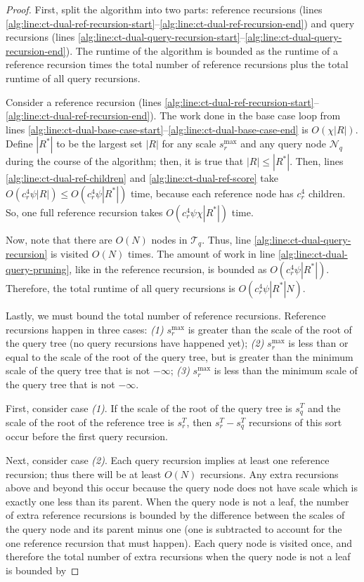 \vspace*{-1.23em}
\begin{proof}
First, split the algorithm into two parts: reference recursions (lines
\ref{alg:line:ct-dual-ref-recursion-start}--\ref{alg:line:ct-dual-ref-recursion-end})
and query recursions (lines
\ref{alg:line:ct-dual-query-recursion-start}--\ref{alg:line:ct-dual-query-recursion-end}).
The runtime of the algorithm is bounded as the runtime of a reference recursion
times the total number of reference recursions plus the total runtime of all
query recursions.

Consider a reference recursion (lines
\ref{alg:line:ct-dual-ref-recursion-start}--\ref{alg:line:ct-dual-ref-recursion-end}).
The work done in the base case loop from lines
\ref{alg:line:ct-dual-base-case-start}--\ref{alg:line:ct-dual-base-case-end} is
$O(\chi | R |)$.  Define $| R^* |$ to be the largest set $|R|$ for any scale
$s_r^{\max}$ and any query node $\mathscr{N}_q$ during the course of the
algorithm; then, it is true that $| R | \le | R^* |$.
%
Then, lines \ref{alg:line:ct-dual-ref-children} and
\ref{alg:line:ct-dual-ref-score} take $O(c_r^4 \psi | R |) \le O(c_r^4 \psi |
R^* |)$ time, because each reference node has $c_r^4$ children.  So, one
full reference recursion takes $O(c_r^4 \psi \chi | R^* |)$ time.

Now, note that there are $O(N)$ nodes in $\mathscr{T}_q$.  Thus, line
\ref{alg:line:ct-dual-query-recursion} is visited $O(N)$ times.  The amount of
work in line \ref{alg:line:ct-dual-query-pruning}, like in the reference
recursion, is bounded as $O(c_r^4 \psi | R^* |)$. Therefore, the total
runtime of all query recursions is $O(c_r^4 \psi | R^* | N)$.

Lastly, we must bound the total number of reference recursions.  Reference
recursions happen in three cases: \textit{(1)} $s_r^{\max}$ is greater than the
scale of the root of the query tree (no query recursions have happened yet);
\textit{(2)} $s_r^{\max}$ is less than or equal to the scale of the root of the
query tree, but is greater than the minimum scale of the query tree that is not
$-\infty$; \textit{(3)} $s_r^{\max}$ is less than the minimum scale of the query
tree that is not $-\infty$.

First, consider case \textit{(1)}.  If the scale of the root of the query tree
is $s_q^T$ and the scale of the root of the reference tree is $s_r^T$, then
$s_r^T - s_q^T$ recursions of this sort occur before the first query recursion.

Next, consider case \textit{(2)}.  Each query recursion implies at least one
reference recursion; thus there will be at least $O(N)$ recursions.  Any
extra recursions above and beyond this occur because the query node does not
have scale which is exactly one less than its parent.  When the query node is
not a leaf, the number of extra reference recursions is bounded by the
difference between the scales of the query node and its parent minus one (one is
subtracted to account for the one reference recursion that must happen).  Each
query node is visited once, and therefore the total number of extra recursions
when the query node is not a leaf is bounded by


\end{proof}
